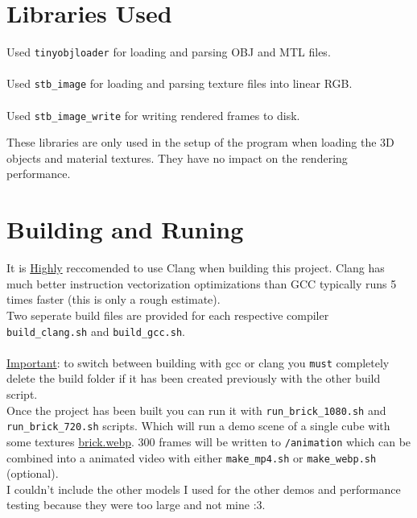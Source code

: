 \documentclass[12pt]{article}
\begin{document}
\section{Libraries Used}

Used \texttt{tinyobjloader}\cite{tinyobjloader} for loading and parsing OBJ and MTL files.\\
\\
Used \texttt{stb\_image}\cite{stb-image} for loading and parsing texture files into linear RGB.\\
\\
Used \texttt{stb\_image\_write}\cite{stb-image-write} for writing rendered frames to disk.

These libraries are only used in the setup of the program when loading the 3D objects and material textures. They have no impact on the rendering performance.

\section{Building and Runing}

It is \underline{Highly} reccomended to use Clang when building this project. Clang has much better instruction vectorization optimizations than GCC typically runs 5 times faster (this is only a rough estimate). 
\\

Two seperate build files are provided for each respective compiler \texttt{build\_clang.sh} and \texttt{build\_gcc.sh}. \\
\\
\underline{Important}: to switch between building with gcc or clang you \texttt{must} completely delete the build folder if it has been created previously with the other build script.\\

Once the project has been built you can run it with \texttt{run\_brick\_1080.sh} and \texttt{run\_brick\_720.sh} scripts. Which will run a demo scene of a single cube with some textures \href{https://github.com/ParkerTenBroeck/3P93/blob/529db5749c074b050dfc25d55a320687e4204814/p2/code/examples/brick.webp}{brick.webp}. 300 frames will be written to \texttt{/animation} which can be combined into a animated video with either \texttt{make\_mp4.sh} or \texttt{make\_webp.sh} (optional). \\

I couldn't include the other models I used for the other demos and performance testing because they were too large and not mine :3.


\nocite{*}


\end{document}
